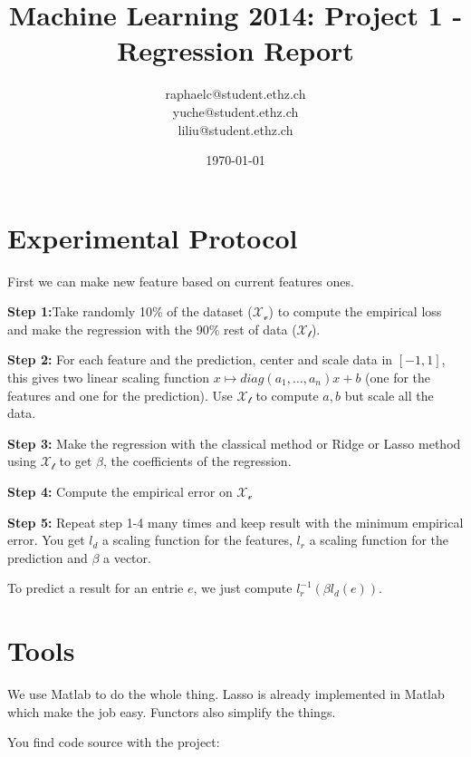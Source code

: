 \documentclass[a4paper, 11pt]{article}
\title{Machine Learning 2014: Project 1 - Regression Report}
\author{raphaelc@student.ethz.ch\\ yuche@student.ethz.ch\\ liliu@student.ethz.ch\\}
\date{\today}
\begin{document}
\maketitle

\section*{Experimental Protocol}

First we can make new feature based on current features ones.

\textbf{Step 1:}Take randomly 10\% of the dataset ($\mathcal{X_v}$) to compute the empirical loss and make the regression with the 90\% rest of data ($\mathcal{X_t}$).

\textbf{Step 2:} For each feature and the prediction, center and scale data in $[-1,1]$, this gives two linear scaling function $x\mapsto diag(a_1,\ldots,a_n) x + b$ (one for the features and one for the prediction). Use $\mathcal{X_t}$ to compute $a,b$ but scale all the data.

\textbf{Step 3:} Make the regression with the classical method or Ridge or Lasso method using $\mathcal{X_t}$ to get $\beta$, the coefficients of the regression.

\textbf{Step 4:} Compute the empirical error on $\mathcal{X_v}$

\textbf{Step 5:} Repeat step 1-4 many times and keep result with the minimum empirical error. You get $l_d$ a scaling function for the features, $l_r$ a scaling function for the prediction and $\beta$ a vector.

To predict a result for an entrie $e$, we just compute $l_r^{-1}(\beta l_d(e))$.


\section{Tools}

We use Matlab to do the whole thing. Lasso is already implemented in Matlab which make the job easy.
Functors also simplify the things. 

You find code source with the project:
\end{document}
